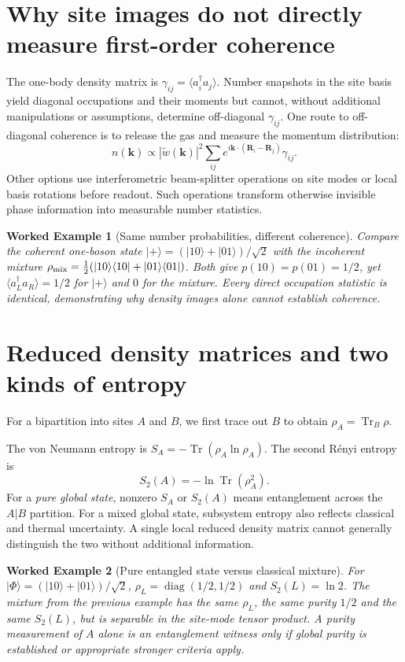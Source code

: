 \documentclass[11pt,a4paper]{article}
\newtheorem{example}{Worked Example}
\newcommand{\tr}{\operatorname{Tr}}
\begin{document}
\section{Why site images do not directly measure first-order coherence}
The one-body density matrix is $\gamma_{ij}=\langle a_i^\dagger a_j\rangle$. Number snapshots in the site basis yield diagonal occupations and their moments but cannot, without additional manipulations or assumptions, determine off-diagonal $\gamma_{ij}$. One route to off-diagonal coherence is to release the gas and measure the momentum distribution:
\begin{equation}n(\mathbf k)\propto|\widetilde w(\mathbf k)|^2\sum_{ij}e^{i\mathbf k\cdot(\mathbf R_i-\mathbf R_j)}\gamma_{ij}.\end{equation}
Other options use interferometric beam-splitter operations on site modes or local basis rotations before readout. Such operations transform otherwise invisible phase information into measurable number statistics.
\begin{example}[Same number probabilities, different coherence]
Compare the coherent one-boson state $|+\rangle=(|10\rangle+|01\rangle)/\sqrt2$ with the incoherent mixture $\rho_{\rm mix}=\tfrac12(|10\rangle\langle10|+|01\rangle\langle01|)$. Both give $p(10)=p(01)=1/2$, yet $\langle a_L^\dagger a_R\rangle=1/2$ for $|+\rangle$ and $0$ for the mixture. Every direct occupation statistic is identical, demonstrating why density images alone cannot establish coherence.
\end{example}
\section{Reduced density matrices and two kinds of entropy}
For a bipartition into sites $A$ and $B$, we first trace out $B$ to obtain $\rho_A=\tr_B\rho$.\par The von Neumann entropy is $S_A=-\tr(\rho_A\ln\rho_A)$. The second R\'enyi entropy is
\begin{equation}\boxed{S_2(A)=-\ln\tr(\rho_A^2).}\label{eq:renyi}\end{equation}
For a \emph{pure global state}, nonzero $S_A$ or $S_2(A)$ means entanglement across the $A|B$ partition. For a mixed global state, subsystem entropy also reflects classical and thermal uncertainty. A single local reduced density matrix cannot generally distinguish the two without additional information.
\begin{example}[Pure entangled state versus classical mixture]
For $|\Phi\rangle=(|10\rangle+|01\rangle)/\sqrt2$, $\rho_L=\operatorname{diag}(1/2,1/2)$ and $S_2(L)=\ln2$. The mixture from the previous example has the \emph{same} $\rho_L$, the same purity $1/2$ and the same $S_2(L)$, but is separable in the site-mode tensor product. A purity measurement of $A$ alone is an entanglement witness only if global purity is established or appropriate stronger criteria apply.
\end{example}
\end{document}
